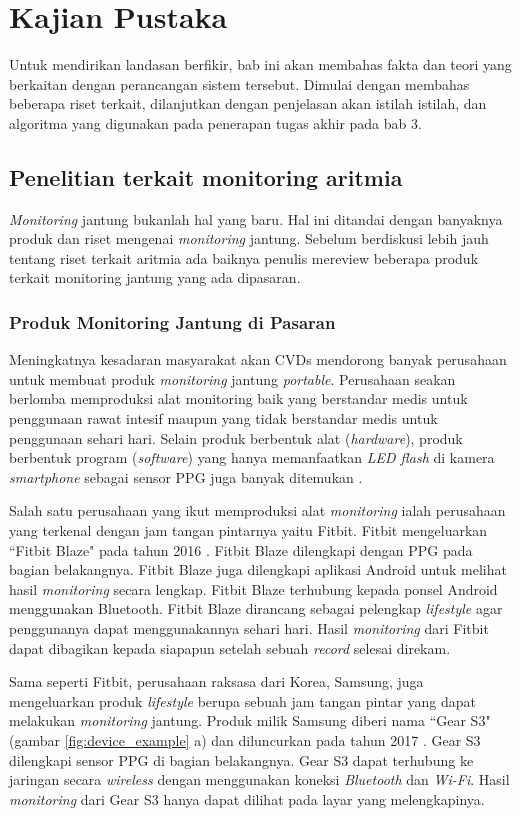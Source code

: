 \chapter{Kajian Pustaka}
Untuk mendirikan landasan berfikir, bab ini akan membahas fakta dan teori yang berkaitan dengan perancangan sistem tersebut. Dimulai dengan membahas beberapa riset terkait, dilanjutkan dengan penjelasan akan istilah istilah, dan algoritma yang digunakan pada penerapan tugas akhir pada bab 3.

\section{Penelitian terkait monitoring aritmia}
\textit{Monitoring} jantung bukanlah hal yang baru. Hal ini ditandai dengan banyaknya produk dan riset mengenai \textit{monitoring} jantung. Sebelum berdiskusi lebih jauh tentang riset terkait aritmia ada baiknya penulis mereview beberapa produk terkait monitoring jantung yang ada dipasaran.

\subsection{Produk Monitoring Jantung di Pasaran}
Meningkatnya kesadaran masyarakat akan CVDs mendorong banyak perusahaan untuk membuat produk \textit{monitoring} jantung \textit{portable}. Perusahaan seakan berlomba memproduksi alat monitoring baik yang berstandar medis untuk penggunaan rawat intesif maupun yang tidak berstandar medis untuk penggunaan sehari hari. Selain produk berbentuk alat (\textit{hardware}), produk berbentuk program (\textit{software}) yang hanya memanfaatkan \textit{LED flash} di kamera \textit{smartphone} sebagai sensor PPG juga banyak ditemukan \cite{playstore_heart}.

Salah satu perusahaan yang ikut memproduksi alat \textit{monitoring} ialah perusahaan yang terkenal dengan jam tangan pintarnya yaitu Fitbit. Fitbit mengeluarkan ``Fitbit Blaze" pada tahun 2016 \cite{online:fitbit}. Fitbit Blaze dilengkapi dengan PPG pada bagian belakangnya. Fitbit Blaze juga dilengkapi aplikasi Android untuk melihat hasil \textit{monitoring} secara lengkap. Fitbit Blaze terhubung kepada ponsel Android menggunakan Bluetooth. Fitbit Blaze dirancang sebagai pelengkap \textit{lifestyle} agar penggunanya dapat menggunakannya sehari hari. Hasil \textit{monitoring} dari Fitbit dapat dibagikan kepada siapapun setelah sebuah \textit{record} selesai direkam.

Sama seperti Fitbit, perusahaan raksasa dari Korea, Samsung, juga mengeluarkan produk \textit{lifestyle} berupa sebuah jam tangan pintar yang dapat melakukan \textit{monitoring} jantung. Produk milik Samsung diberi nama ``Gear S3" (gambar \ref{fig:device_example} a) dan diluncurkan pada tahun 2017 \cite{online:samsung_gear}. Gear S3 dilengkapi sensor PPG di bagian belakangnya. Gear S3 dapat terhubung ke jaringan secara \textit{wireless} dengan menggunakan koneksi \textit{Bluetooth} dan \textit{Wi-Fi}. Hasil \textit{monitoring} dari Gear S3 hanya dapat dilihat pada layar yang melengkapinya.

